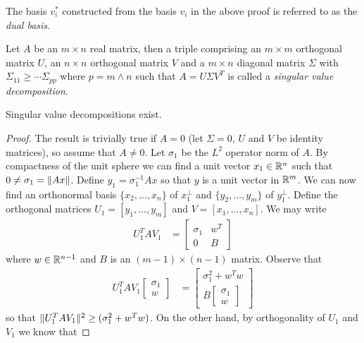 The basis $v^*_i$ constructed from the basis $v_i$ in the above proof is referred to as the \emph{dual basis}.  

\begin{defn}Let $A$ be an $m \times n$ real matrix, then a triple comprising an $m \times m$ orthogonal matrix $U$, an $n \times n$ orthogonal matrix $V$ and a $m \times n$ diagonal matrix $\Sigma$ with $\Sigma_{11} \geq \dotsb \Sigma_{pp}$ where $p = m \wedge n$ such that $A = U \Sigma V^T$ is called a \emph{singular value decomposition}.
\end{defn}

\begin{thm}\label{SingularValueDecomposition}Singular value decompositions exist.
\end{thm}
\begin{proof}
The result is trivially true if $A = 0$ (let $\Sigma=0$, $U$ and $V$ be identity matrices), so assume that $A \neq 0$.  Let $\sigma_1$ be the $L^2$ operator norm of $A$.   By compactness of the unit sphere we can find a unit vector $x_1 \in \mathbb{R}^n$ such that $0 \neq \sigma_1 = \lVert Ax \rVert$.  Define $y_1 = \sigma^{-1}_1 Ax$ so that $y$ is a unit vector in $\mathbb{R}^m$.  We can now find an orthonormal basis $\lbrace x_2, \dotsc, x_n \rbrace$ of $x_1^{\perp}$ and $\lbrace y_2, \dotsc, y_m \rbrace$ of $y_1^{\perp}$.  Define the orthogonal matrices $U_1 = [y_1, \dotsc, y_m]$ and $V = [x_1, \dotsc, x_n]$.  We may write
\begin{align*}
U_1^T A V_1 &=
\begin{bmatrix}
\sigma_1 & w^T \\
0 & B
\end{bmatrix}
\end{align*}
where $w \in \mathbb{R}^{n-1}$ and $B$ is an $(m-1) \times (n-1)$ matrix.
Observe that
\begin{align*}
U_1^T A V_1 \begin{bmatrix} \sigma_1 \\ w\end{bmatrix}
&= \begin{bmatrix} \sigma_1^2 + w^T w \\ 
B \begin{bmatrix} \sigma_1 \\ w\end{bmatrix}
 \end{bmatrix}
\end{align*}
so that $\lVert U_1^T A V_1 \rVert^2 \geq (\sigma_1^2 + w^T w )$.  On the other hand, by orthogonality of $U_1$ and $V_1$ we know that

\end{proof}
